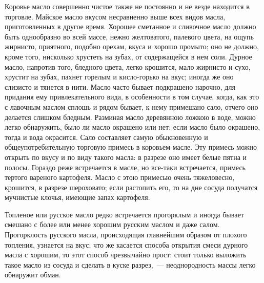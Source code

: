 Коровье масло совершенно чистое также не постоянно и не везде находится в торговле. Майское масло вкусом несравненно выше всех видов масла, приготовленных в другое время. Хорошее сметанное и сливочное масло должно быть однообразно во всей массе, нежно желтоватого, палевого цвета, на ощупь жирнисто, приятного, подобно орехам, вкуса и хорошо промыто; оно не должно, кроме того, нисколько хрустеть на зубах, от содержащейся в нем соли. Дурное масло, напротив того, бледного цвета, легко крошится, мало жирнисто и сухо, хрустит на зубах, пахнет горелым и кисло-горько на вкус; иногда же оно слизисто и тянется в нити. Масло часто бывает подкрашено нарочно, для придания ему привлекательного вида, в особенности в том случае, когда, как это с лавочным маслом сплошь и рядом бывает, к нему примешано сало, отчего оно делается слишком бледным. Разминая масло деревянною ложкою в воде, можно легко обнаружить, было ли масло окрашено или нет: если масло было окрашено, тогда и вода окрасится. Сало составляет самую обыкновенную и общеупотребительную торговую примесь в коровьем масле. Эту примесь можно открыть по вкусу и по виду такого масла: в разрезе оно имеет белые пятна и полосы. Гораздо реже встречается в масле, но все-таки встречается, примесь тертого вареного картофеля. Масло с этою примесью очень тяжеловесно, крошится, в разрезе шероховато; если растопить его, то на дне сосуда получатся мучнистые клочья, имеющие запах картофеля.

Топленое или русское масло редко встречается прогорклым и иногда бывает смешано с более или менее хорошим русским маслом и даже салом. Прогорклость русского масла, происходящая главнейшим образом от плохого топления, узнается на вкус; что же касается способа открытия смеси дурного масла с хорошим, то этот способ чрезвычайно прост: стоит только выложить такое масло из сосуда и сделать в куске разрез,~--- неоднородность массы легко обнаружит обман.

